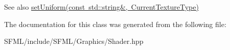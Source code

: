 \begin{DoxySeeAlso}{See also}
\mbox{\hyperlink{classsf_1_1_shader_ab18f531e1f726b88fec1cf5a1e6af26d}{set\+Uniform(const std\+::string\&, Current\+Texture\+Type)}} \begin{DoxyVerb}\end{DoxyVerb}
 
\end{DoxySeeAlso}


The documentation for this class was generated from the following file\+:\begin{DoxyCompactItemize}
\item 
S\+F\+M\+L/include/\+S\+F\+M\+L/\+Graphics/Shader.\+hpp\end{DoxyCompactItemize}
